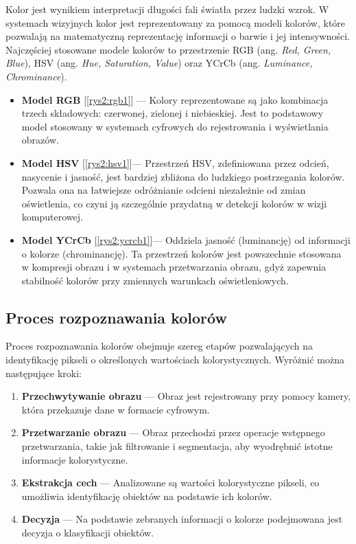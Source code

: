 Kolor jest wynikiem interpretacji długości fali światła przez ludzki wzrok. W systemach wizyjnych kolor jest reprezentowany za pomocą modeli kolorów, które pozwalają na matematyczną reprezentację informacji o barwie i jej intensywności. Najczęściej stosowane modele kolorów to przestrzenie RGB (ang. \textit{Red, Green, Blue}), HSV (ang. \textit{Hue, Saturation, Value}) oraz YCrCb (ang. \textit{Luminance, Chrominance}).

\begin{itemize}
    \item \textbf{Model RGB} [\ref{rys2:rgb1}] — Kolory reprezentowane są jako kombinacja trzech składowych: czerwonej, zielonej i niebieskiej. Jest to podstawowy model stosowany w systemach cyfrowych do rejestrowania i wyświetlania obrazów.
    \item \textbf{Model HSV} [\ref{rys2:hsv1}]— Przestrzeń HSV, zdefiniowana przez odcień, nasycenie i jasność, jest bardziej zbliżona do ludzkiego postrzegania kolorów. Pozwala ona na łatwiejsze odróżnianie odcieni niezależnie od zmian oświetlenia, co czyni ją szczególnie przydatną w detekcji kolorów w wizji komputerowej.
    \item \textbf{Model YCrCb} [\ref{rys2:ycrcb1}]— Oddziela jasność (luminancję) od informacji o kolorze (chrominancję). Ta przestrzeń kolorów jest powszechnie stosowana w kompresji obrazu i w systemach przetwarzania obrazu, gdyż zapewnia stabilność kolorów przy zmiennych warunkach oświetleniowych.
\end{itemize}


\subsection{Proces rozpoznawania kolorów}
Proces rozpoznawania kolorów obejmuje szereg etapów pozwalających na identyfikację pikseli o określonych wartościach kolorystycznych. Wyróżnić można następujące kroki:

\begin{enumerate}
    \item \textbf{Przechwytywanie obrazu} — Obraz jest rejestrowany przy pomocy kamery, która przekazuje dane w formacie cyfrowym.
    \item \textbf{Przetwarzanie obrazu} — Obraz przechodzi przez operacje wstępnego przetwarzania, takie jak filtrowanie i segmentacja, aby wyodrębnić istotne informacje kolorystyczne.
    \item \textbf{Ekstrakcja cech} — Analizowane są wartości kolorystyczne pikseli, co umożliwia identyfikację obiektów na podstawie ich kolorów.
    \item \textbf{Decyzja} — Na podstawie zebranych informacji o kolorze podejmowana jest decyzja o klasyfikacji obiektów.
\end{enumerate}

